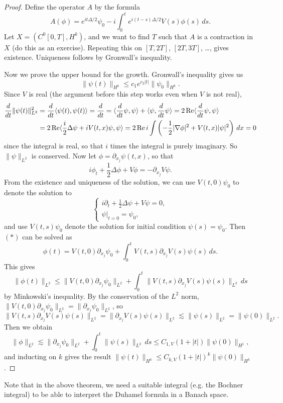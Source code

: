 \begin{proof}
  Define the operator $A$ by the formula
  \[
    A(\phi) = e^{it \Delta / 2} \psi_0 - i\int_0^t e^{i(t - s)\Delta / 2} V(s) \phi(s)\, ds.
  \]
  Let $X = (C^0[0, T], H^k)$, and we want to find
  $T$ such that $A$ is a contraction in $X$ (do this
  as an exercise). Repeating this
  on $[T, 2T]$, $[2T, 3T]$, \dots, gives
  existence. Uniqueness follows by Gronwall's inequality.

  Now we prove the upper bound for the growth.
  Gronwall's inequality gives us
  \[
    \|\psi(t)\|_{H^k} \le c_1 e^{c_2|t|} \|\psi_0\|_{H^k}.
  \]
  Since $V$ is real (the argument before this step
  works even when $V$ is not real),
  \begin{align*}
    \frac{d}{dt} \|\psi(t)\|_{L^2}^2
    &= \frac{d}{dt} \langle \psi(t), \psi(t) \rangle
    = \frac{d}{dt}
    = \langle \frac{d}{dt} \psi, \psi \rangle
    + \langle \psi, \frac{d}{dt} \psi \rangle
    = 2 \operatorname{Re} \langle \frac{d}{dt} \psi, \psi \rangle \\
    &= 2 \operatorname{Re} \langle \frac{i}{2} \Delta \psi + iV(t, x) \psi, \psi \rangle
    = 2\operatorname{Re} i \int \left(-\frac{1}{2} |\nabla \phi|^2 + V(t, x)|\psi|^2\right)\, dx = 0
  \end{align*}
  since the integral is real, so that $i$ times the
  integral is purely imaginary. So
  $\|\psi\|_{L^2}$ is conserved.
  Now let $\phi = \partial_{x_j} \psi(t, x)$, so that
  \[
    i\phi_t + \frac{1}{2} \Delta \phi + V \phi = -\partial_{x_j} V\psi. \tag{$*$}
  \]
  From the existence and uniqueness of the solution,
  we can use $V(t, 0) \psi_0$ to denote the solution
  to
  \[
    \begin{cases}
      i\partial_t + \frac{1}{2} \Delta \psi + V \psi = 0, \\
      \psi|_{t = 0} = \psi_0,
    \end{cases}
  \]
  and use $V(t, s) \psi_0$ denote the solution
  for initial condition $\psi(s) = \psi_0$. Then
  $(*)$ can be solved as
  \[
    \phi(t) = V(t, 0) \partial_{x_j} \psi_0
    + \int_0^t V(t, s) \partial_{x_j} V(s) \psi(s)\, ds.
  \]
  This gives
  \[
    \|\phi(t)\|_{L^2} \le
    \|V(t, 0) \partial_{x_j} \psi_0\|_{L^2}
    + \int_0^t \|V(t, s) \partial_{x_j} V(s) \psi(s)\|_{L^2}\, ds
  \]
  by Minkowski's inequality.  By the
  conservation of the $L^2$ norm,
  $\|V(t, 0) \partial_{x_j} \psi_0\|_{L^2} = \|\partial_{x_j} \psi_0 \|_{L^2}$, so
  \[
    \|V(t, s) \partial_{x_j} V(s) \psi(s)\|_{L^2}
    = \|\partial_{x_j} V(s) \psi(s)\|_{L^2}
    \lesssim \|\psi(s)\|_{L^2} = \|\psi(0)\|_{L^2}.
  \]
  Then we obtain
  \[
    \|\phi\|_{L^2} \lesssim
    \|\partial_{x_j} \psi_0\|_{L^2}
    + \int_0^t \|\psi(s)\|_{L^2}\, ds
    \le C_{1, V} (1 + |t|) \|\psi(0)\|_{H^1},
  \]
  and inducting on $k$ gives the result
  $\|\psi(t)\|_{H^k} \le C_{k, V} (1 + |t|)^k \|\psi(0)\|_{H^k}$.
\end{proof}

\begin{remark}
  Note that in the above theorem, we need a suitable
  integral (e.g. the Bochner integral) to be able to
  interpret the Duhamel formula in a Banach space.
\end{remark}
